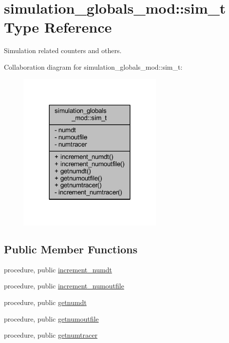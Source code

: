 \hypertarget{structsimulation__globals__mod_1_1sim__t}{}\section{simulation\+\_\+globals\+\_\+mod\+:\+:sim\+\_\+t Type Reference}
\label{structsimulation__globals__mod_1_1sim__t}


Simulation related counters and others.  




Collaboration diagram for simulation\+\_\+globals\+\_\+mod\+:\+:sim\+\_\+t\+:
\nopagebreak
\begin{figure}[H]
\begin{center}
\leavevmode
\includegraphics[width=204pt]{structsimulation__globals__mod_1_1sim__t__coll__graph}
\end{center}
\end{figure}
\subsection*{Public Member Functions}
\begin{DoxyCompactItemize}
\item 
procedure, public \mbox{\hyperlink{structsimulation__globals__mod_1_1sim__t_a252c6fe9d5783ddb0ed2b3a78444c18e}{increment\+\_\+numdt}}
\item 
procedure, public \mbox{\hyperlink{structsimulation__globals__mod_1_1sim__t_aa8ef9d1e862c541c700b3bae819d7d12}{increment\+\_\+numoutfile}}
\item 
procedure, public \mbox{\hyperlink{structsimulation__globals__mod_1_1sim__t_a631b55f5da372943464059c0aef77f09}{getnumdt}}
\item 
procedure, public \mbox{\hyperlink{structsimulation__globals__mod_1_1sim__t_a968cc771ddeefe57addd7391a5bc8aaf}{getnumoutfile}}
\item 
procedure, public \mbox{\hyperlink{structsimulation__globals__mod_1_1sim__t_a18168855c804f8215039f3b1388435f8}{getnumtracer}}
\end{DoxyCompactItemize}
